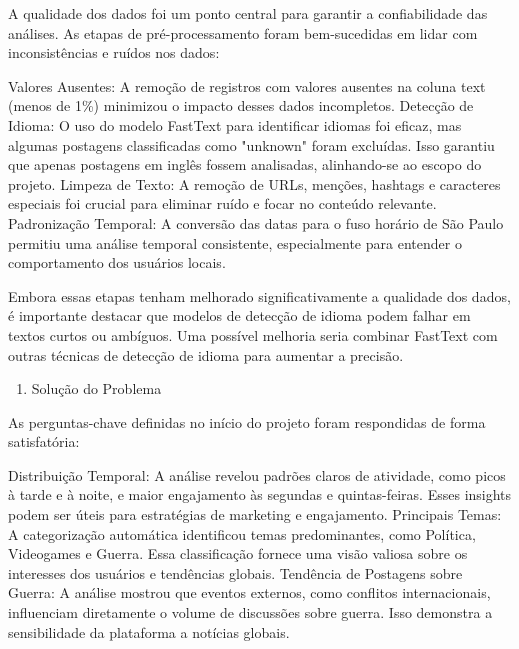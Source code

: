 \documentclass[
  letterpaper,
  DIV=11,
  numbers=noendperiod]{scrartcl}
\providecommand{\tightlist}{%
  \setlength{\itemsep}{0pt}\setlength{\parskip}{0pt}}\usepackage{longtable,booktabs,array}
\begin{document}
A qualidade dos dados foi um ponto central para garantir a
confiabilidade das análises. As etapas de pré-processamento foram
bem-sucedidas em lidar com inconsistências e ruídos nos dados:

\begin{VerbatimWithBreaks}
Valores Ausentes:  A remoção de registros com valores ausentes na coluna text (menos de 1\%) minimizou o impacto desses dados incompletos.
Detecção de Idioma:  O uso do modelo FastText para identificar idiomas foi eficaz, mas algumas postagens classificadas como "unknown" foram excluídas. Isso garantiu que apenas postagens em inglês fossem analisadas, alinhando-se ao escopo do projeto.
Limpeza de Texto:  A remoção de URLs, menções, hashtags e caracteres especiais foi crucial para eliminar ruído e focar no conteúdo relevante.
Padronização Temporal:  A conversão das datas para o fuso horário de São Paulo permitiu uma análise temporal consistente, especialmente para entender o comportamento dos usuários locais.
 
\end{VerbatimWithBreaks}

Embora essas etapas tenham melhorado significativamente a qualidade dos
dados, é importante destacar que modelos de detecção de idioma podem
falhar em textos curtos ou ambíguos. Uma possível melhoria seria
combinar FastText com outras técnicas de detecção de idioma para
aumentar a precisão.

\begin{enumerate}
\def\labelenumi{\arabic{enumi}.}
\setcounter{enumi}{1}
\tightlist
\item
  Solução do Problema
\end{enumerate}

As perguntas-chave definidas no início do projeto foram respondidas de
forma satisfatória:

\begin{VerbatimWithBreaks}
Distribuição Temporal:  A análise revelou padrões claros de atividade, como picos à tarde e à noite, e maior engajamento às segundas e quintas-feiras. Esses insights podem ser úteis para estratégias de marketing e engajamento.
Principais Temas:  A categorização automática identificou temas predominantes, como Política, Videogames e Guerra. Essa classificação fornece uma visão valiosa sobre os interesses dos usuários e tendências globais.
Tendência de Postagens sobre Guerra:  A análise mostrou que eventos externos, como conflitos internacionais, influenciam diretamente o volume de discussões sobre guerra. Isso demonstra a sensibilidade da plataforma a notícias globais.
 
\end{VerbatimWithBreaks}
\end{document}
